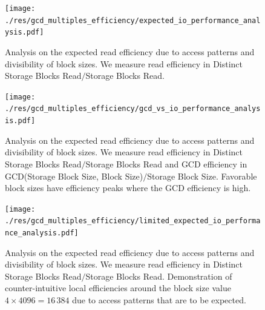 \documentclass[twocolumn]{article}
\begin{document}
\begin{figure}[htb]
    \begin{minipage}{0.475 \textwidth}
        \centering
        \texttt{[image: ./res/gcd\_multiples\_efficiency/expected\_io\_performance\_analysis.pdf]}
        \caption{Analysis on the expected read efficiency due to access patterns and divisibility of block sizes. We measure read efficiency in Distinct Storage Blocks Read\( / \)Storage Blocks Read. }
        \label{fig:expected_io_performance_analysis.pdf}
    \end{minipage}
\end{figure}

\begin{figure}[htb]
    \begin{minipage}{0.475 \textwidth}
        \centering
        \texttt{[image: ./res/gcd\_multiples\_efficiency/gcd\_vs\_io\_performance\_analysis.pdf]}
        \caption{Analysis on the expected read efficiency due to access patterns and divisibility of block sizes. We measure read efficiency in Distinct Storage Blocks Read\( / \)Storage Blocks Read and
            GCD efficiency in GCD(Storage Block Size, Block Size)\( / \)Storage Block Size. Favorable block sizes have efficiency peaks where the GCD efficiency is high. }
        \label{fig:gcd_vs_io_performance_analysis.pdf}
    \end{minipage}
\end{figure}

\begin{figure}[htb]
    \begin{minipage}{0.475 \textwidth}
        \centering
        \texttt{[image: ./res/gcd\_multiples\_efficiency/limited\_expected\_io\_performance\_analysis.pdf]}
        \caption{Analysis on the expected read efficiency due to access patterns and divisibility of block sizes. We measure read efficiency in Distinct Storage Blocks Read\( / \)Storage Blocks Read. Demonstration of
            counter-intuitive local efficiencies around the block size value \( 4 \times 4096 = 16\,384 \) due to access patterns that are to be expected. }
        \label{fig:limited_expected_io_performance_analysis.pdf}
    \end{minipage}
\end{figure}
\end{document}
